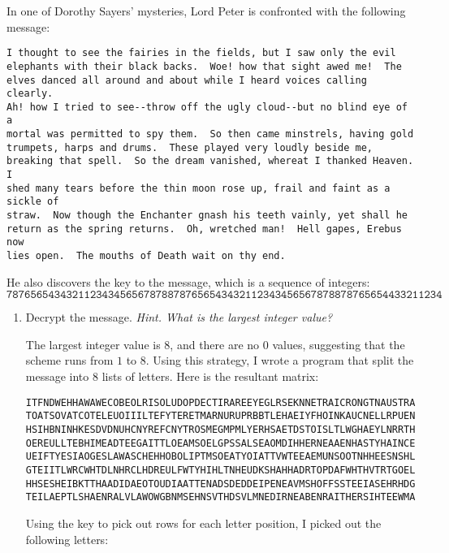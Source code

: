 
\begin{problem}
In one of Dorothy Sayers' mysteries, Lord Peter is confronted with the following message:

\vspace{1ex}

\begin{verbatim}
I thought to see the fairies in the fields, but I saw only the evil
elephants with their black backs.  Woe! how that sight awed me!  The
elves danced all around and about while I heard voices calling clearly.
Ah! how I tried to see--throw off the ugly cloud--but no blind eye of a
mortal was permitted to spy them.  So then came minstrels, having gold
trumpets, harps and drums.  These played very loudly beside me,
breaking that spell.  So the dream vanished, whereat I thanked Heaven.  I
shed many tears before the thin moon rose up, frail and faint as a sickle of
straw.  Now though the Enchanter gnash his teeth vainly, yet shall he
return as the spring returns.  Oh, wretched man!  Hell gapes, Erebus now
lies open.  The mouths of Death wait on thy end.
\end{verbatim}
\vspace{1ex}

He also discovers the key to the message, which is a sequence of integers:
\[ 
\texttt{7876565434321123434565678788787656543432112343456567878878765654433211234}
\]

\begin{enumerate}\renewcommand{\itemsep}{3mm}
\item Decrypt the message. \emph{Hint. What is the largest integer value?}

\begin{Answer}
The largest integer value is $8$, and there are no $0$ values,
suggesting that the scheme runs from $1$ to $8$.
Using this strategy, I wrote a program that split the message
into 8 lists of letters.
Here is the resultant matrix:
{
\color{blue}%
\begin{verbatim}
ITFNDWEHHAWAWECOBEOLRISOLUDOPDECTIRAREEYEGLRSEKNNETRAICRONGTNAUSTRAPSOOEO
TOATSOVATCOTELEUOIIILTEFYTERETMARNURUPRBBTLEHAEIYFHOINKAUCNELLRPUENENPUAN
HSIHBNINHKESDVDNUHCNYREFCNYTROSMEGMPMLYERHSAETDSTOISLTLWGHAEYLNRRTHSOETTT
OEREULLTEBHIMEADTEEGAITTLOEAMSOELGPSSALSEAOMDIHHERNEAAENHASTYHAINCEEWNHHH
UEIFTYESIAOGESLAWASCHEHHOBOLIPTMSOEATYOIATTVWTEEAEMUNSOOTNHHEESNSHLRLTSWY
GTEIITLWRCWHTDLNHRCLHDREULFWTYHIHLTNHEUDKSHAHHADRTOPDAFWHTHVTRTGOELEIHOAE
HHSESHEIBKTTHAADIDAEOTOUDIAATTENADSDEDDEIPENEAVMSHOFFSSTEEIASEHRHDGBEEFIN
TEILAEPTLSHAENRALVLAWOWGBNMSEHNSVTHDSVLMNEDIRNEABENRAITHERSIHTEEWMAUSMDTD
\end{verbatim}
}
\noindent
Using the key to pick out rows for each letter position,
I picked out the following letters:


\end{Answer}
\end{enumerate}
\end{problem}

